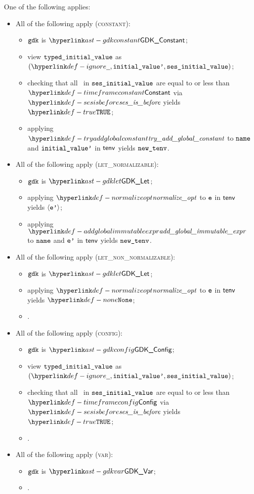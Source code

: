 \ProseParagraph
One of the following applies:
\begin{itemize}
  \item All of the following apply (\textsc{constant}):
  \begin{itemize}
    \item $\texttt{gdk}$ is $\GDKConstant$;
    \item view $\texttt{typed\_initial\_value}$ as $(\Ignore, \initialvaluep, \vsesinitialvalue)$;
    \item checking that all \timeframesterm\ in $\texttt{ses\_initial\_value}$ are equal to or less than
          $\timeframeconstant$ via $\sesisbefore$ yields $\True$\ProseOrTypeError;
    \item applying $\tryaddglobalconstant$ to $\texttt{name}$ and $\texttt{initial\_value'}$ in $\tenv$ yields $\newtenv$.
  \end{itemize}

  \item All of the following apply (\textsc{let\_normalizable}):
  \begin{itemize}
    \item $\texttt{gdk}$ is $\GDKLet$;
    \item applying $\normalizeopt$ to $\texttt{e}$ in $\tenv$ yields $\langle\texttt{e'}\rangle$\ProseOrTypeError;
    \item applying $\addglobalimmutableexpr$ to $\texttt{name}$ and $\texttt{e'}$ in $\tenv$ yields $\newtenv$.
  \end{itemize}

  \item All of the following apply (\textsc{let\_non\_normalizable}):
  \begin{itemize}
    \item $\texttt{gdk}$ is $\GDKLet$;
    \item applying $\normalizeopt$ to $\texttt{e}$ in $\tenv$ yields $\None$\ProseOrTypeError;
    \item \Proseeqdef{$\newtenv$}{$\tenv$}.
  \end{itemize}

  \item All of the following apply (\textsc{config}):
  \begin{itemize}
    \item $\texttt{gdk}$ is $\GDKConfig$;
    \item view $\texttt{typed\_initial\_value}$ as $(\Ignore, \initialvaluep, \vsesinitialvalue)$;
    \item checking that all \timeframesterm\ in $\texttt{ses\_initial\_value}$ are equal to or less than
          $\timeframeconfig$ via $\sesisbefore$ yields $\True$\ProseOrTypeError;
    \item \Proseeqdef{$\newtenv$}{$\tenv$}.
  \end{itemize}

  \item All of the following apply (\textsc{var}):
  \begin{itemize}
    \item $\texttt{gdk}$ is $\GDKVar$;
    \item \Proseeqdef{$\newtenv$}{$\tenv$}.
  \end{itemize}
\end{itemize}


